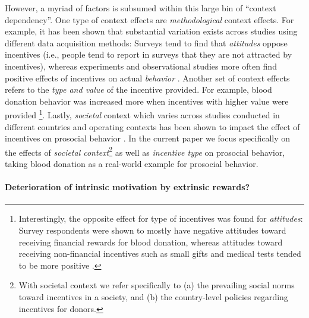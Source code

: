 \documentclass[AER]{AEA}
\begin{document}
However, a myriad of factors is subsumed within this large bin of “context dependency”. One type of context effects are \textit{methodological} context effects. For example, it has been shown that substantial variation exists across studies using different data acquisition methods: Surveys tend to find that \textit{attitudes} oppose incentives (i.e., people tend to report in surveys that they are not attracted by incentives), whereas experiments and observational studies more often find positive effects of incentives on actual \textit{behavior} \cite[i.e., the amount of prosocial behavior tends to be positively affected by incentives; ][]{chell_systematic_2018}. Another set of context effects refers to the \textit{type and value} of the incentive provided. For example, blood donation behavior was increased more when incentives with higher value were provided \citep{lacetera_economic_2013}\footnote{Interestingly, the opposite effect for type of incentives was found for \textit{attitudes}: Survey respondents were shown to mostly have negative attitudes toward receiving financial rewards for blood donation, whereas attitudes toward receiving non-financial incentives such as small gifts and medical tests tended to be more positive \citep{lacetera_economic_2013}.}. Lastly, \textit{societal} context which varies across studies conducted in different countries and operating contexts has been shown to impact the effect of incentives on prosocial behavior \citep{chell_systematic_2018}. In the current paper we focus specifically on the effects of \textit{societal context}\footnote{With societal context we refer specifically to (a) the prevailing social norms toward incentives in a society, and (b) the country-level policies regarding incentives for donors.} as well as \textit{incentive type} on prosocial behavior, taking blood donation as a real-world example for prosocial behavior. 

\paragraph{Deterioration of intrinsic motivation by extrinsic rewards?}
\end{document}
